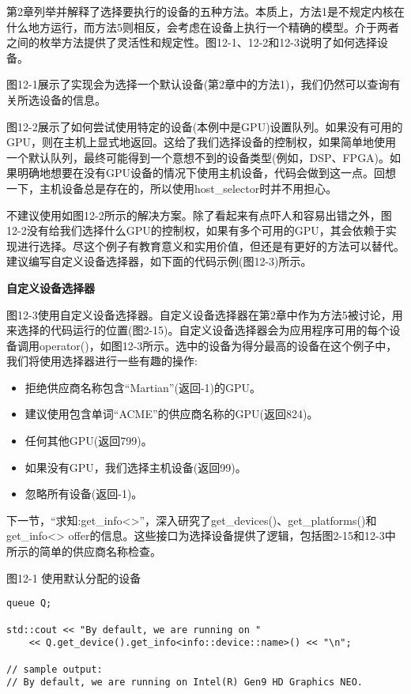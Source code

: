 第2章列举并解释了选择要执行的设备的五种方法。本质上，方法1是不规定内核在什么地方运行，而方法5则相反，会考虑在设备上执行一个精确的模型。介于两者之间的枚举方法提供了灵活性和规定性。图12-1、12-2和12-3说明了如何选择设备。\par

图12-1展示了实现会为选择一个默认设备(第2章中的方法1)，我们仍然可以查询有关所选设备的信息。\par

图12-2展示了如何尝试使用特定的设备(本例中是GPU)设置队列。如果没有可用的GPU，则在主机上显式地返回。这给了我们选择设备的控制权，如果简单地使用一个默认队列，最终可能得到一个意想不到的设备类型(例如，DSP、FPGA)。如果明确地想要在没有GPU设备的情况下使用主机设备，代码会做到这一点。回想一下，主机设备总是存在的，所以使用host\_selector时并不用担心。\par

不建议使用如图12-2所示的解决方案。除了看起来有点吓人和容易出错之外，图12-2没有给我们选择什么GPU的控制权，如果有多个可用的GPU，其会依赖于实现进行选择。尽这个例子有教育意义和实用价值，但还是有更好的方法可以替代。建议编写自定义设备选择器，如下面的代码示例(图12-3)所示。\par

\hspace*{\fill} \par %
\textbf{自定义设备选择器}

图12-3使用自定义设备选择器。自定义设备选择器在第2章中作为方法5被讨论，用来选择的代码运行的位置(图2-15)。自定义设备选择器会为应用程序可用的每个设备调用operator()，如图12-3所示。选中的设备为得分最高的设备在这个例子中，我们将使用选择器进行一些有趣的操作:\par

\begin{itemize}
	\item 拒绝供应商名称包含“Martian”(返回-1)的GPU。
	\item 建议使用包含单词“ACME”的供应商名称的GPU(返回824)。
	\item 任何其他GPU(返回799)。
	\item 如果没有GPU，我们选择主机设备(返回99)。
	\item 忽略所有设备(返回-1)。
\end{itemize}

下一节，“求知:get\_info<>”，深入研究了get\_devices()、get\_platforms()和get\_info<> offer的信息。这些接口为选择设备提供了逻辑，包括图2-15和12-3中所示的简单的供应商名称检查。\par

\hspace*{\fill} \par %
图12-1 使用默认分配的设备
\begin{lstlisting}[caption={}]
queue Q;

std::cout << "By default, we are running on "
	<< Q.get_device().get_info<info::device::name>() << "\n";

// sample output:
// By default, we are running on Intel(R) Gen9 HD Graphics NEO.
\end{lstlisting}

